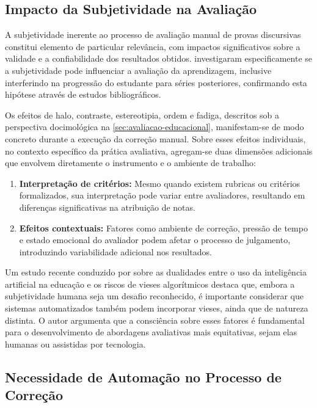 \subsection{Impacto da Subjetividade na Avaliação}

A subjetividade inerente ao processo de avaliação manual de provas discursivas constitui elemento de particular relevância, com impactos significativos sobre a validade e a confiabilidade dos resultados obtidos.  investigaram especificamente se a subjetividade pode influenciar a avaliação da aprendizagem, inclusive interferindo na progressão do estudante para séries posteriores, confirmando esta hipótese através de estudos bibliográficos.

Os efeitos de halo, contraste, estereotipia, ordem e fadiga, descritos sob a perspectiva docimológica na \autoref{sec:avaliacao-educacional}, manifestam-se de modo concreto durante a execução da correção manual. Sobre esses efeitos individuais, no contexto específico da prática avaliativa, agregam-se duas dimensões adicionais que envolvem diretamente o instrumento e o ambiente de trabalho:

\begin{enumerate}
    \item  \textbf{Interpretação de critérios:} Mesmo quando existem rubricas ou critérios formalizados, sua interpretação pode variar entre avaliadores, resultando em diferenças significativas na atribuição de notas.

    \item  \textbf{Efeitos contextuais:} Fatores como ambiente de correção, pressão de tempo e estado emocional do avaliador podem afetar o processo de julgamento, introduzindo variabilidade adicional nos resultados.
\end{enumerate}

Um estudo recente conduzido por  sobre as dualidades entre o uso da inteligência artificial na educação e os riscos de vieses algorítmicos destaca que, embora a subjetividade humana seja um desafio reconhecido, é importante considerar que sistemas automatizados também podem incorporar vieses, ainda que de natureza distinta. O autor argumenta que a consciência sobre esses fatores é fundamental para o desenvolvimento de abordagens avaliativas mais equitativas, sejam elas humanas ou assistidas por tecnologia.

\subsection{Necessidade de Automação no Processo de Correção}

